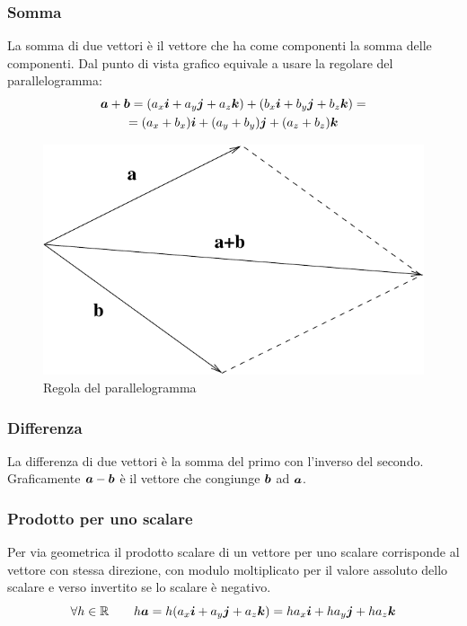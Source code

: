 \subsubsection{Somma}
La somma di due vettori è il vettore che ha come componenti la somma delle componenti. Dal punto di vista grafico equivale a usare la regolare del parallelogramma:
\begin{multline*}
\boldsymbol{a}+\boldsymbol{b}=(a_x\boldsymbol{i}+a_y\boldsymbol{j}+a_z \boldsymbol{k})+(b_x\boldsymbol{i}+b_y\boldsymbol{j}+b_z\boldsymbol{k})=\\
=(a_x+b_x)\boldsymbol{i}+(a_y+b_y)\boldsymbol{j}+(a_z+b_z)\boldsymbol{k}
\end{multline*}
\begin{figure}[htbp]
\centering
\includegraphics[scale=0.5]{immagini/fisica1/somma_vettori}
\caption{Regola del parallelogramma}
\end{figure}



\subsubsection{Differenza} La differenza di due
vettori è la somma del primo con l'inverso del secondo. Graficamente $\boldsymbol{a}-\boldsymbol{b}$ è il vettore che congiunge $\boldsymbol{b}$ ad $\boldsymbol{a}$.
\subsubsection{Prodotto per uno scalare}
Per via geometrica il prodotto scalare di un vettore per uno scalare corrisponde al vettore con stessa direzione, con modulo moltiplicato per il valore assoluto dello scalare e verso invertito se lo scalare è negativo.
\begin{equation*}\forall h \in \mathbb{R}\qquad h\boldsymbol{a}=h(a_x\boldsymbol{i}+a_y\boldsymbol{j}+a_z\boldsymbol{k})=ha_x\boldsymbol{i}+ha_y\boldsymbol{j}+ha_z\boldsymbol{k}\end{equation*}
